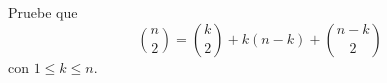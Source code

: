 \begin{statement}{19}
  Pruebe que
  \[
    \binom{n}{2} = \binom{k}{2} + k (n - k) + \binom{n - k}{2}
  \]
  con $1 \leq k \leq n$.
\end{statement}